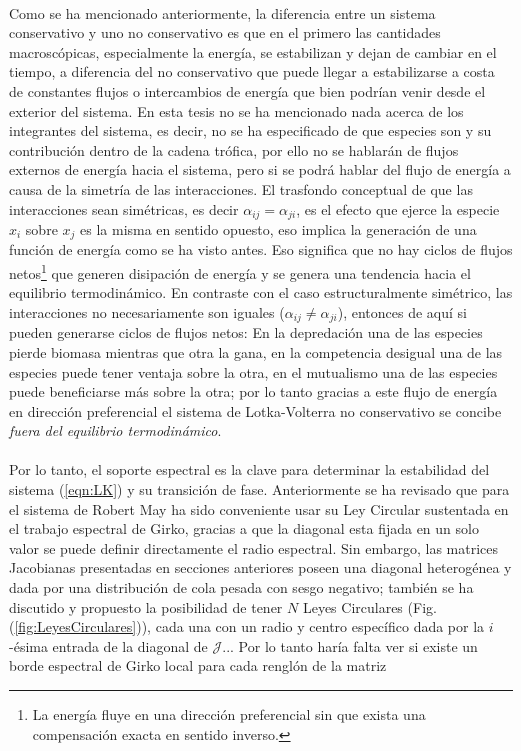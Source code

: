 \\
Como se ha mencionado anteriormente, la diferencia entre un sistema conservativo y uno no conservativo es que en el primero las cantidades macroscópicas, especialmente la energía, se estabilizan y dejan de cambiar en el tiempo, a diferencia del no conservativo que puede llegar a estabilizarse a costa de constantes flujos o intercambios de energía que bien podrían venir desde el exterior del sistema. En esta tesis no se ha mencionado nada acerca de los integrantes del sistema, es decir, no se ha especificado de que especies son y su contribución dentro de la cadena trófica, por ello no se hablarán de flujos externos de energía hacia el sistema, pero si se podrá hablar del flujo de energía a causa de la simetría de las interacciones.
\newpage
El trasfondo conceptual de que las interacciones sean simétricas, es decir $\alpha_{ij}=\alpha_{ji}$, es el efecto que ejerce la especie $x_i$ sobre $x_j$ es la misma en sentido opuesto, eso implica la generación de una función de energía como se ha visto antes. Eso significa que no hay ciclos de flujos netos\footnote{La energía fluye en una dirección preferencial sin que exista una compensación exacta en sentido inverso.} que generen disipación de energía y se genera una tendencia hacia el equilibrio termodinámico. En contraste con el caso estructuralmente simétrico, las interacciones no necesariamente son iguales ($\alpha_{ij}\neq\alpha_{ji}$), entonces de aquí si pueden generarse ciclos de flujos netos: En la depredación una de las especies pierde biomasa mientras que otra la gana, en la competencia desigual una de las especies puede tener ventaja sobre la otra, en el mutualismo una de las especies puede beneficiarse más sobre la otra; por lo tanto gracias a este flujo de energía en dirección preferencial el sistema de Lotka-Volterra no conservativo se concibe \textit{fuera del equilibrio termodinámico}.\\
\\
Por lo tanto, el soporte espectral es la clave para determinar la estabilidad del sistema (\ref{eqn:LK}) y su transición de fase. Anteriormente se ha revisado que para el sistema de Robert May ha sido conveniente usar su Ley Circular sustentada en el trabajo espectral de Girko, gracias a que la diagonal esta fijada en un solo valor se puede definir directamente el radio espectral. Sin embargo, las matrices Jacobianas presentadas en secciones anteriores poseen una diagonal heterogénea y dada por una distribución de cola pesada con sesgo negativo; también se ha discutido y propuesto la posibilidad de tener $N$ Leyes Circulares (Fig. (\ref{fig:LeyesCirculares})), cada una con un radio y centro específico dada por la $i$-ésima entrada de la diagonal de $\mathcal{J}$... Por lo tanto haría falta ver si existe un borde espectral de Girko local para cada renglón de la matriz 